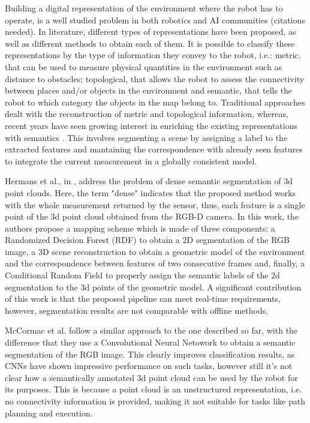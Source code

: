 \documentclass{article}
\begin{document}
	Building a digital representation of the environment where the robot has to operate, is a well studied problem in both robotics and AI communities (citations needed). In literature,  different types of representations have been proposed, as well as different methods to obtain each of them. It  is possible to classify these representations by the type of information they convey to the robot, i.e.: metric, that can be used to measure physical quantities in the environment such as distance to obstacles; topological, that allows the robot to assess the connectivity between places and/or objects in the environment and semantic, that tells the robot to which category the objects in the map belong to. Traditional approaches dealt with the reconstruction of metric and topological information, whereas, recent years have seen growing interest in enriching the existing representations with semantics \cite{kostavelis2015semantic,liu2016extracting}. This involves segmenting a scene by assigning a label to the extracted features and mantaining the correspondence with already seen features to integrate the current measurement in a globally consistent model.
	
	Hermans et al., in \cite{hermans2014dense}, address the problem of dense semantic segmentation of 3d point clouds. Here, the term "dense" indicates that the proposed method works with the whole measurement returned by the sensor, thus, each feature is a single point of the 3d point cloud obtained from the RGB-D camera. In this work, the authors propose a mapping scheme which is made of three components: a Randomized Decision Forest (RDF) to obtain a 2D segmentation of the RGB image, a 3D scene reconstruction to obtain a geometric model of the environment and the correspondence between features of two consecutive frames and, finally, a Conditional Random Field \cite{krahenbuhl2011efficient} to properly assign the semantic labels of the 2d segmentation to the 3d points of the geometric model. A significant contribution of this work is that the proposed pipeline can meet real-time requirements, however, segmentation results are not comparable with offline methods.
	
	McCormac et al. \cite{mccormac2017semanticfusion} follow a similar approach to the one described so far, with the difference that they use a Convolutional Neural Netowork \cite{noh2015learning} to obtain a semantic segmentation of the RGB image.  This clearly improves classification results, as CNNs have shown impressive performance on such tasks, however still it's not clear how a semantically annotated 3d point cloud can be used by the robot for its purposes. This is because a point cloud is an unstructured representation, i.e. no connectivity information is provided, making it not suitable for tasks like path planning and execution.
	
\end{document}
